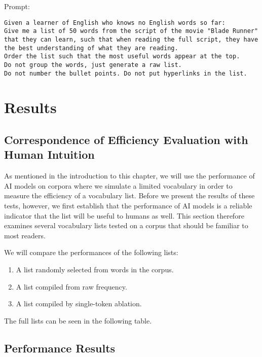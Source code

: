 Prompt:

\begin{lstlisting}[caption={Prompt given to the language model.}, label={lst:blade_runner_prompt}, captionpos=b]
	Given a learner of English who knows no English words so far:
Give me a list of 50 words from the script of the movie "Blade Runner" that they can learn, such that when reading the full script, they have the best understanding of what they are reading.
Order the list such that the most useful words appear at the top.
Do not group the words, just generate a raw list.
Do not number the bullet points. Do not put hyperlinks in the list.

\end{lstlisting}

\section{Results} \label{sec:results}

\subsection{Correspondence of Efficiency Evaluation with Human Intuition}
As mentioned in the introduction to this chapter, we will use the performance of AI models on corpora where we simulate a limited vocabulary in order to measure the efficiency of a vocabulary list.
Before we present the results of these tests, however, we first establish that the performance of AI models is a reliable indicator that the list will be useful to humans as well.
This section therefore examines several vocabulary lists tested on a corpus that should be familiar to most readers.

We will compare the performances of the following lists:
\begin{enumerate}
	\item A list randomly selected from words in the corpus.
	\item A list compiled from raw frequency.
	\item A list compiled by single-token ablation.
\end{enumerate}

The full lists can be seen in the following table.

\subsection{Performance Results}

